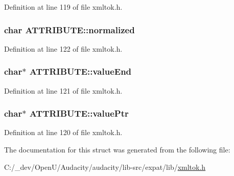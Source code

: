 Definition at line 119 of file xmltok.\+h.

\subsubsection[{\texorpdfstring{normalized}{normalized}}]{\setlength{\rightskip}{0pt plus 5cm}char A\+T\+T\+R\+I\+B\+U\+T\+E\+::normalized}\hypertarget{struct_a_t_t_r_i_b_u_t_e_ab58ed5e3d2fd99385f6f7166ffead55a}{}\label{struct_a_t_t_r_i_b_u_t_e_ab58ed5e3d2fd99385f6f7166ffead55a}


Definition at line 122 of file xmltok.\+h.

\subsubsection[{\texorpdfstring{value\+End}{valueEnd}}]{ char$\ast$ A\+T\+T\+R\+I\+B\+U\+T\+E\+::value\+End}\hypertarget{struct_a_t_t_r_i_b_u_t_e_ad551901b9645e6abea66612eda5ac49e}{}\label{struct_a_t_t_r_i_b_u_t_e_ad551901b9645e6abea66612eda5ac49e}


Definition at line 121 of file xmltok.\+h.

\subsubsection[{\texorpdfstring{value\+Ptr}{valuePtr}}]{ char$\ast$ A\+T\+T\+R\+I\+B\+U\+T\+E\+::value\+Ptr}\hypertarget{struct_a_t_t_r_i_b_u_t_e_aa74f5eb3f75d6a6e28fbf0c020bbe021}{}\label{struct_a_t_t_r_i_b_u_t_e_aa74f5eb3f75d6a6e28fbf0c020bbe021}


Definition at line 120 of file xmltok.\+h.



The documentation for this struct was generated from the following file\+:\begin{DoxyCompactItemize}
\item 
C\+:/\+\_\+dev/\+Open\+U/\+Audacity/audacity/lib-\/src/expat/lib/\hyperlink{xmltok_8h}{xmltok.\+h}\end{DoxyCompactItemize}
